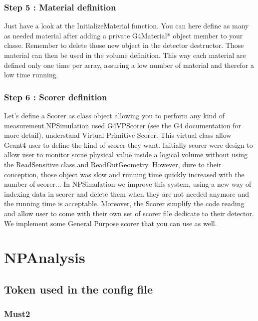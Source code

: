 \documentclass{book}
\begin{document}
		
		\subsection{Step 5 : Material definition}

		Just have a look at the InitializeMaterial function. 
		You can here define as many as needed material after adding a private G4Material* object member to your classe. 
		Remember to delete those new object in the detector destructor. Those material can then be used in the volume definition. 
		This way each material are defined only one time per array, assuring a low number of material and therefor a low time running.

		\subsection{Step 6 : Scorer definition}
	
	Let's define a Scorer as class object allowing you to perform any kind of measurement.NPSimulation used G4VPScorer (see the G4 documentation for more detail), understand Virtual Primitive Scorer. 
	This virtual class allow Geant4 user to define the kind of scorer they want. 
	Initially scorer were design to allow user to monitor some physical value inside a logical volume without using the ReadSensitive class and ReadOutGeometry. 
	However, dure to their conception, those object was slow and running time quickly increased with the number of scorer... 
	In NPSimulation we improve this system, using a new way of indexing data in scorer and delete them when they are not needed anymore and the running time is acceptable. 
	Moreover, the Scorer simplify the code reading and allow user to come with their own set of scorer file dedicate to their detector. 
	We implement some General Purpose scorer that you can use as well.

\chapter[NPAnalysis]{NPAnalysis}

   \section{Token used in the config file}
      \subsection{Must2}
      
\end{document}
